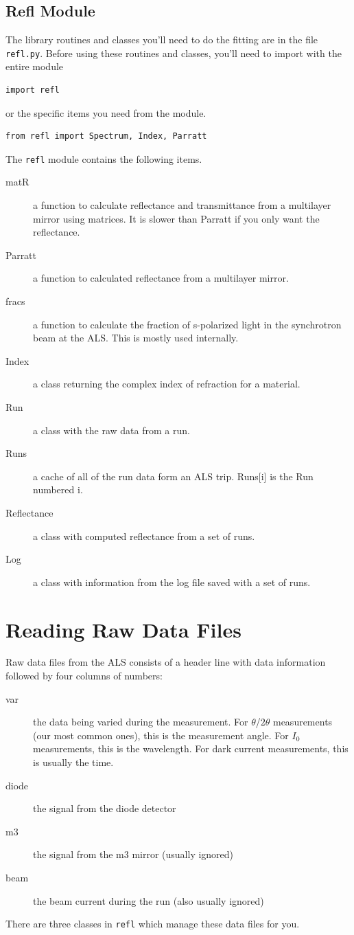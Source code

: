 \documentclass[english]{scrartcl}
\begin{document}
\subsection{Refl Module}
The library routines and classes you'll need to do the fitting
are in the file \texttt{refl.py}. Before using these routines and
classes, you'll need to import with the entire module
\begin{lstlisting}
import refl
\end{lstlisting}
or the specific items you need from the module.
\begin{lstlisting}
from refl import Spectrum, Index, Parratt
\end{lstlisting}
The \texttt{refl} module contains the following items.
\begin{description}
\item [matR] a function to calculate reflectance and transmittance
	from a multilayer mirror using matrices. It is slower than
	Parratt if you only want the reflectance.
\item [Parratt] a function to calculated reflectance from a
	multilayer mirror.
\item [fracs] a function to calculate the fraction of s-polarized
	light in the synchrotron beam at the ALS. This is mostly used
	internally.
\item [Index] a class returning the complex index of refraction
	for a material.
\item [Run] a class with the raw data from a run.
\item [Runs] a cache of all of the run data form an ALS
	trip. Runs[i] is the Run numbered i.
\item [Reflectance] a class with computed reflectance from a set
	of runs.
\item [Log] a class with information from the log file saved
	with a set of runs.
\end{description}

\section{Reading Raw Data Files}
Raw data files from the ALS consists of a header line with data
information followed by four columns of numbers:
\begin{description}
\item [var] the data being varied during the measurement. For
	$\theta$/$2\theta$ measurements (our most common ones), this
	is the measurement angle. For $I_0$ measurements, this is the
	wavelength. For dark current measurements, this is usually
	the time.
\item [diode] the signal from the diode detector
\item [m3] the signal from the m3 mirror (usually ignored)
\item [beam] the beam current during the run (also usually ignored)
\end{description}
There are three classes in \texttt{refl} which manage these data files
for you.
\end{document}

